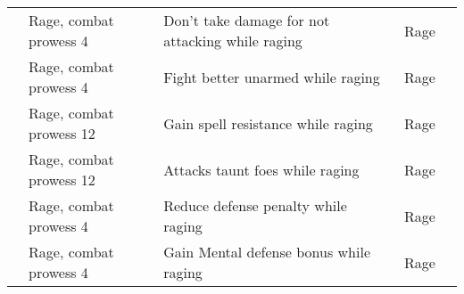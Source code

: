 \begin{longtabuwrapper}
\begin{longtabu}{>{\lcol}p{10em} >{\lcol}p{15em} >{\lcol}X >{\lcol}p{8em} >{\lcol}p{3em}}
                  & Rage, combat prowess 4                 & Don't take damage for not attacking while raging & Rage &  \\
                   & Rage, combat prowess 4                 & Fight better unarmed while raging & Rage &  \\
             & Rage, combat prowess 12                & Gain spell resistance while raging & Rage &  \\
                 & Rage, combat prowess 12                & Attacks taunt foes while raging & Rage &  \\
                     & Rage, combat prowess 4                 & Reduce defense penalty while raging & Rage &  \\
                  & Rage, combat prowess 4                 & Gain Mental defense bonus while raging & Rage &  \\


\end{longtabu}
\end{longtabuwrapper}
